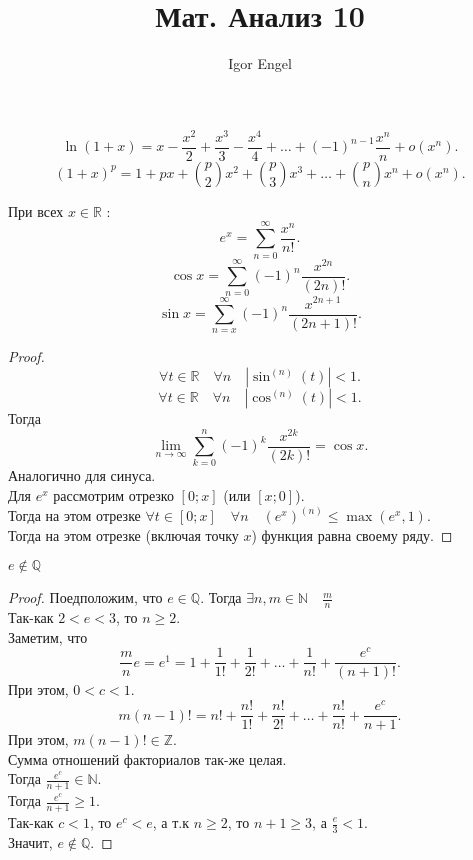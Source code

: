 \documentclass[11pt, oneside]{article}   	%
\title{Мат. Анализ 10}
\author{Igor Engel}
\date{}
\begin{document}
\maketitle
\section{}
    \subsection{}
    \[ \ln(1+x) = x - \frac{x^2}{2} + \frac{x^3}{3} - \frac{x^{4}}{4} + \ldots + (-1)^{n-1}\frac{x^{n}}{n} + o(x^{n}) .\] 
    \[ (1+x)^{p} = 1 + px + \binom{p}{2}x^2 + \binom{p}{3}x^3  + \ldots + \binom{p}{n}x^{n} + o(x^{n}).\]
    \begin{theorem}
        При всех $x\in \mathbb{R}$ :
        \[ e^{x} = \sum\limits_{n=0}^{\infty} \frac{x^{n}}{n!} .\] 
        \[ \cos x = \sum\limits_{n=0}^{\infty} (-1)^{n} \frac{x^{2n}}{(2n)!} .\]
        \[ \sin x = \sum\limits_{n=x}^{\infty} (-1)^{n} \frac{x^{2n+1}}{(2n+1)!} .\]
        \begin{proof}
            \[ \forall{t\in \mathbb{R}}\quad \forall{n}\quad \left|\sin^{(n)}(t)\right| < 1 .\]
            \[ \forall{t\in \mathbb{R}}\quad \forall{n}\quad \left|\cos^{(n)}(t)\right| < 1 .\]
            Тогда
            \[ \lim\limits_{n \to \infty} \sum\limits_{k=0}^{n} (-1)^{k}\frac{x^{2k}}{(2k)!} = \cos x .\]
            Аналогично для синуса.\\
            Для $e^{x}$ рассмотрим отрезко $\left[0; x\right]$ (или $\left[x; 0\right]$).\\
            Тогда на этом отрезке $\forall{t\in \left[0; x\right]}\quad \forall{n}\quad (e^{x})^{(n)} \le \max\left( e^{x}, 1 \right) $.\\
            Тогда на этом отрезке (включая точку $x$) функция равна своему ряду.
        \end{proof}
    \end{theorem}
    \begin{theorem}
        $e \not\in \mathbb{Q}$ 
        \begin{proof}
        Поедположим, что $e\in \mathbb{Q}$. Тогда $\exists{n,m\in \mathbb{N}}\quad \frac{m}{n}$\\
        Так-как $2 <e < 3$, то $n\ge 2$.\\
        Заметим, что 
        \[ \frac{m}{n} e = e^{1} = 1 + \frac{1}{1!} + \frac{1}{2!} + \ldots + \frac{1}{n!} + \frac{e^{c}}{(n+1)!} .\]
        При этом, $0 < c < 1$.\\
        \[ m(n-1)! = n! + \frac{n!}{1!} + \frac{n!}{2!} + \ldots + \frac{n!}{n!} + \frac{e^{c}}{n+1} .\]
        При этом, $m(n-1)!\in \mathbb{Z}$.\\
        Сумма отношений факториалов так-же целая.\\
        Тогда $\frac{e^{c}}{n+1}\in \mathbb{N}$.\\
        Тогда $\frac{e^{c}}{n+1} \ge 1$.\\
        Так-как $c<1$, то $e^{c} < e$, а т.к $n\ge 2$, то $n+1 \ge 3$, а $\frac{e}{3} < 1$.\\
        Значит, $e \not\in \mathbb{Q}$.
        \end{proof}
    \end{theorem}
\end{document}
